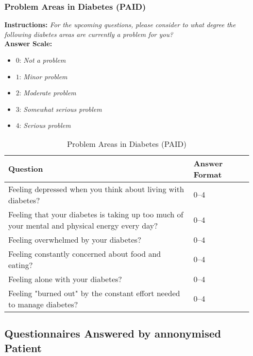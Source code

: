\subsubsection{Problem Areas in Diabetes (PAID)}
\textbf{Instructions:} \emph{For the upcoming questions, please consider to what degree the following diabetes areas are currently a problem for you?}
\\
\textbf{Answer Scale:}
\begin{itemize}
    \item $0$: \emph{Not a problem}
    \item $1$: \emph{Minor problem}
    \item $2$: \emph{Moderate problem}
    \item $3$: \emph{Somewhat serious problem}
    \item $4$: \emph{Serious problem}
\end{itemize}
\begin{table}[H]
    \centering
    \renewcommand{\arraystretch}{1.2}
    \begin{tabularx}{\textwidth}{|l|X|l|}
        \hline
        \textbf{Question} & \textbf{Answer Format} \\ \hline
        Feeling depressed when you think about living with diabetes? & 0--4 \\ \hline
        Feeling that your diabetes is taking up too much of your mental and physical energy every day? & 0--4 \\ \hline
        Feeling overwhelmed by your diabetes? & 0--4 \\ \hline
        Feeling constantly concerned about food and eating? & 0--4 \\ \hline
        Feeling alone with your diabetes? & 0--4 \\ \hline
        Feeling "burned out" by the constant effort needed to manage diabetes? & 0--4 \\ \hline
    \end{tabularx}
    \caption{Problem Areas in Diabetes (PAID)}
    \label{tab:problem-areas-in-diabetes}
\end{table}


\newpage
\subsection{Questionnaires Answered by annonymised Patient}
